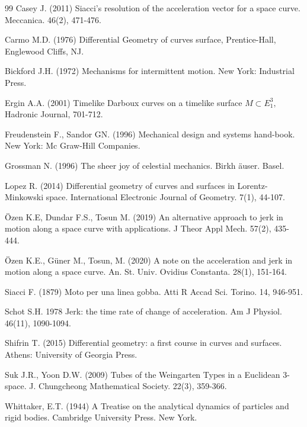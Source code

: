 \documentclass[reqno]{amsart}
\theoremstyle{plain}
\numberwithin{equation}{section}
\begin{document}
\begin{thebibliography}{99}
 Casey J. (2011) Siacci's resolution of the acceleration vector
for a space curve. Meccanica. 46(2), 471-476.

 Carmo M.D. (1976) Differential Geometry of curves surface,
Prentice-Hall, Englewood Cliffs, NJ.

 Bickford J.H. (1972) Mechanisms for intermittent motion. New
York: Industrial Press.

 Ergin A.A. (2001) Timelike Darboux curves on a timelike surface $%
M\subset E_{1}^{3},$ Hadronic Journal, 701-712.

 Freudenstein F., Sandor GN. (1996) Mechanical design and systems
hand-book. New York: Mc Graw-Hill Companies.

 Grossman N. (1996) The sheer joy of celestial mechanics. Birkh%
\"{a}user. Basel.

 Lopez R. (2014) Differential geometry of curves and surfaces in
Lorentz-Minkowski space. International Electronic Journal of Geometry. 7(1),
44-107.

 \"{O}zen K.E, Dundar F.S., Tosun M. (2019) An alternative
approach to jerk in motion along a space curve with applications. J Theor
Appl Mech. 57(2), 435-444.

 \"{O}zen K.E., G\"{u}ner M., Tosun, M. (2020) A note on the
acceleration and jerk in motion along a space curve. An. St. Univ. Ovidius
Constanta. 28(1), 151-164.

 Siacci F. (1879) Moto per una linea gobba. Atti R Accad Sci.
Torino. 14, 946-951.

 Schot S.H. 1978 Jerk: the time rate of change of acceleration.
Am J Physiol. 46(11), 1090-1094.

 Shifrin T. (2015) Differential geometry: a first course in
curves and surfaces. Athens: University of Georgia Press.

 Suk J.R., Yoon D.W. (2009) Tubes of the Weingarten Types in a
Euclidean 3-space. J. Chungcheong Mathematical Society. 22(3), 359-366.

 Whittaker, E.T. (1944) A Treatise on the analytical dynamics of
particles and rigid bodies. Cambridge University Press. New York.
\end{thebibliography}
\end{document}
